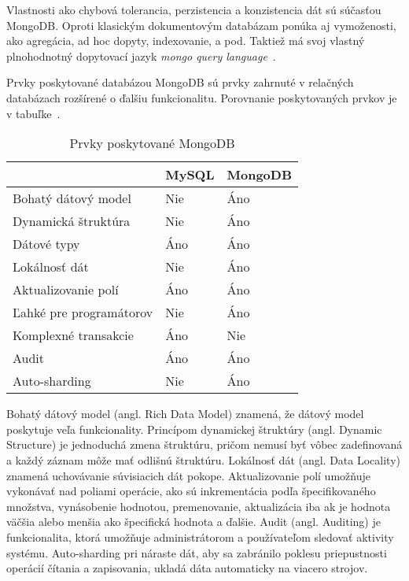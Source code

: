 Vlastnosti ako chybová tolerancia, perzistencia a konzistencia dát sú súčasťou MongoDB. Oproti klasickým dokumentovým databázam ponúka aj vymoženosti, ako agregácia, ad hoc dopyty, indexovanie, a pod. Taktiež má svoj vlastný plnohodnotný dopytovací jazyk \textit{mongo query language}~\cite{NoSQLDBvsRealtionDB}.

Prvky poskytované databázou MongoDB sú prvky zahrnuté v relačných databázach rozšírené o ďalšiu funkcionalitu. Porovnanie poskytovaných prvkov je v tabuľke~. 

\begin{table}[H]
	\centering
	\caption{Prvky poskytované MongoDB}
	\label{table:features_of_mongodb}
	\begin{tabular}{|l|l|l|}
		\hline
		& \textbf{MySQL} & \textbf{MongoDB} \\ \hline
		Bohatý dátový model & Nie & Áno \\ \hline
		Dynamická štruktúra & Nie & Áno \\ \hline
		Dátové typy & Áno & Áno \\ \hline
		Lokálnosť dát & Nie & Áno \\ \hline
		Aktualizovanie polí & Áno & Áno \\ \hline
		Ľahké pre programátorov & Nie & Áno \\ \hline
		Komplexné transakcie & Áno & Nie \\ \hline
		Audit & Áno & Áno \\ \hline
		Auto-sharding & Nie & Áno \\ \hline
	\end{tabular}
\end{table}

Bohatý dátový model (angl. Rich Data Model) znamená, že dátový model poskytuje veľa funkcionality. Princípom dynamickej štruktúry (angl. Dynamic Structure) je jednoduchá zmena štruktúru, pričom nemusí byť vôbec zadefinovaná a každý záznam môže mať odlišnú štruktúru. Lokálnosť dát (angl. Data Locality) znamená uchovávanie súvisiacich dát pokope. Aktualizovanie polí umožňuje vykonávať nad poliami operácie, ako sú inkrementácia podľa špecifikovaného množstva, vynásobenie hodnotou, premenovanie, aktualizácia iba ak je hodnota väčšia alebo menšia ako špecifická hodnota a ďalšie. Audit (angl. Auditing) je funkcionalita, ktorá umožňuje administrátorom a používateľom sledovať aktivity systému.
Auto-sharding pri náraste dát, aby sa zabránilo poklesu priepustnosti operácií čítania a zapisovania, ukladá dáta automaticky na viacero strojov.

